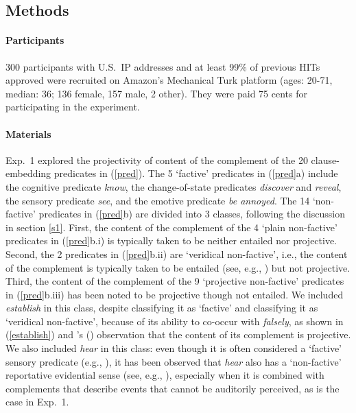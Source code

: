 \documentclass[11pt,fleqn]{article}
\newcommand{\6}{\mbox{$[\hspace*{-.6mm}[$}}
\newcommand{\9}{\mbox{$]\hspace*{-.6mm}]$}}
\newcommand{\citetpos}[1]{\citeauthor{#1}'s (\citeyear{#1})}
\begin{document}
\subsection{Methods}

\paragraph{Participants} 300 participants with U.S.\ IP addresses and at least 99\% of previous HITs approved were recruited on Amazon's Mechanical Turk platform (ages: 20-71, median: 36; 136 female, 157 male, 2 other). They were paid 75 cents for participating in the experiment.

\paragraph{Materials} Exp.~1 explored the projectivity of content of the complement of the 20 clause-embedding predicates in (\ref{pred}). The 5 `factive' predicates in (\ref{pred}a) include the cognitive predicate {\em know}, the change-of-state predicates {\em discover} and {\em reveal}, the sensory predicate {\em see}, and the emotive predicate {\em be annoyed}. The 14 `non-factive' predicates in (\ref{pred}b) are divided into 3 classes, following the discussion in section \ref{s1}. First, the content of the complement of the 4 `plain non-factive' predicates in (\ref{pred}b.i) is typically taken to be neither entailed nor projective. Second, the 2 predicates in  (\ref{pred}b.ii) are `veridical non-factive', i.e., the content of the complement is typically taken to be entailed (see, e.g., \citealt{anand-hacquard2014}) but not projective. Third, the content of the complement of the 9 `projective non-factive' predicates in  (\ref{pred}b.iii)  has been noted to be projective though not entailed. We included  {\em establish} in this class, despite \citet{wyse} classifying it as `factive' and \citet{swanson2012} classifying it as `veridical non-factive', because of its ability to co-occur with {\em falsely}, as shown in (\ref{establish}) and \citetpos{tbd-variability} observation that the content of its complement is projective. We also included {\em hear} in this class: even though it is often considered a `factive' sensory predicate (e.g., \citealt{beaver-belly,anand-hacquard2014}), it has been observed that {\em hear} also has a `non-factive' reportative evidential sense (see, e.g., \citealt{anderson86,simons07}), especially when it is combined with complements that describe events that cannot be auditorily perceived, as is the case in Exp.~1. 
\end{document}
